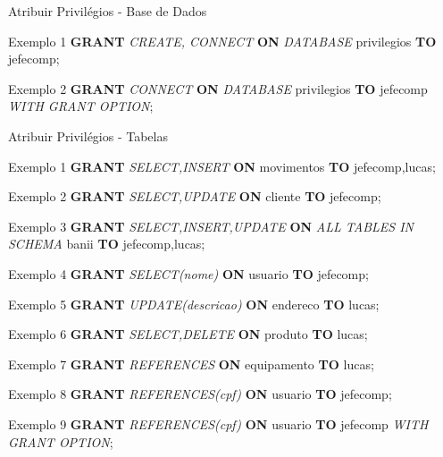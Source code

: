 \documentclass[xcolor=x11names,compress]{beamer}
\begin{document}
\begin{frame}{Atribuir Privilégios - Base de Dados}

\begin{alertblock}{Exemplo 1}
\textbf{GRANT} \textit{CREATE, CONNECT} \textbf{ON} \textit{DATABASE} privilegios \textbf{TO} jefecomp;
\end{alertblock}

\begin{alertblock}{Exemplo 2}
\textbf{GRANT} \textit{CONNECT} \textbf{ON} \textit{DATABASE} privilegios \textbf{TO} jefecomp \textit{WITH GRANT OPTION};
\end{alertblock}

\end{frame}

\begin{frame}[allowframebreaks]{Atribuir Privilégios - Tabelas}

\begin{alertblock}{Exemplo 1}
\textbf{GRANT} \textit{SELECT,INSERT} \textbf{ON} movimentos \textbf{TO} jefecomp,lucas;
\end{alertblock}

\begin{alertblock}{Exemplo 2}
\textbf{GRANT} \textit{SELECT,UPDATE} \textbf{ON} cliente \textbf{TO} jefecomp;
\end{alertblock}

\begin{alertblock}{Exemplo 3}
\textbf{GRANT} \textit{SELECT,INSERT,UPDATE} \textbf{ON} \textit{ALL TABLES IN SCHEMA} banii \textbf{TO} jefecomp,lucas;
\end{alertblock}

\begin{alertblock}{Exemplo 4}
\textbf{GRANT} \textit{SELECT(nome)} \textbf{ON} usuario \textbf{TO} jefecomp;
\end{alertblock}

\begin{alertblock}{Exemplo 5}
\textbf{GRANT} \textit{UPDATE(descricao)} \textbf{ON} endereco \textbf{TO} lucas;
\end{alertblock}

\begin{alertblock}{Exemplo 6}
\textbf{GRANT} \textit{SELECT,DELETE} \textbf{ON} produto \textbf{TO} lucas;
\end{alertblock}

\begin{alertblock}{Exemplo 7}
\textbf{GRANT} \textit{REFERENCES} \textbf{ON} equipamento \textbf{TO} lucas;
\end{alertblock}

\begin{alertblock}{Exemplo 8}
\textbf{GRANT} \textit{REFERENCES(cpf)} \textbf{ON} usuario \textbf{TO} jefecomp;
\end{alertblock}

\begin{alertblock}{Exemplo 9}
\textbf{GRANT} \textit{REFERENCES(cpf)} \textbf{ON} usuario \textbf{TO} jefecomp \textit{WITH GRANT OPTION};
\end{alertblock}

\end{frame}
\end{document}
